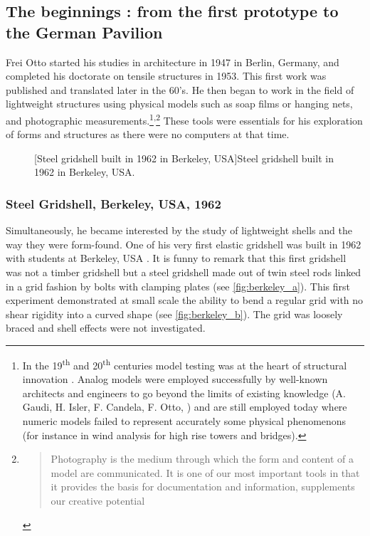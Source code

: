\subsection{The beginnings : from the first prototype to the German Pavilion}
Frei Otto started his studies in architecture in 1947 in Berlin, Germany, and completed his doctorate on tensile structures in 1953. This first work was published and translated later in the 60's. He then began to work in the field of lightweight structures using physical models such as soap films or hanging nets, and photographic measurements.\footnote{In the 19\textsuperscript{th} and 20\textsuperscript{th} centuries model testing was at the heart of structural innovation \cite{Addis2013}. Analog models were employed successfully by well-known architects and engineers to go beyond the limits of existing knowledge (A. Gaudi, H. Isler, F. Candela, F. Otto, \telp{}) and are still employed today where numeric models failed to represent accurately some physical phenomenons (for instance in wind analysis for high rise towers and bridges).}\textsuperscript{,}\footnote{\blockcquote[p.~56]{IL10}{Photography is the medium through which the form and content of a model are communicated. It is one of our most important tools in that it provides the basis for documentation and information, supplements our creative potential \belp{} }} These tools were essentials for his exploration of forms and structures as there were no computers at that time.
\begin{figure}[h]
		\hspace*{\fill}
		\vspace{10pt}
		[Steel gridshell built in 1962 in Berkeley, USA]{Steel gridshell built in 1962 in Berkeley, USA.}
		\label{fig:berkeley}    
\end{figure}

\subsubsection{Steel Gridshell, Berkeley, USA, 1962}
Simultaneously, he became interested by the study of lightweight shells and the way they were form-found. One of his very first elastic gridshell was built in 1962 with students at Berkeley, USA \cite[p.~270]{IL10}. It is funny to remark that this first gridshell was not a timber gridshell but a steel gridshell made out of twin steel rods linked in a grid fashion by bolts with clamping plates (see \cref{fig:berkeley_a}). This first experiment demonstrated at small scale the ability to bend a regular grid with no shear rigidity into a curved shape  (see \cref{fig:berkeley_b}). The grid was loosely braced and shell effects were not investigated.

